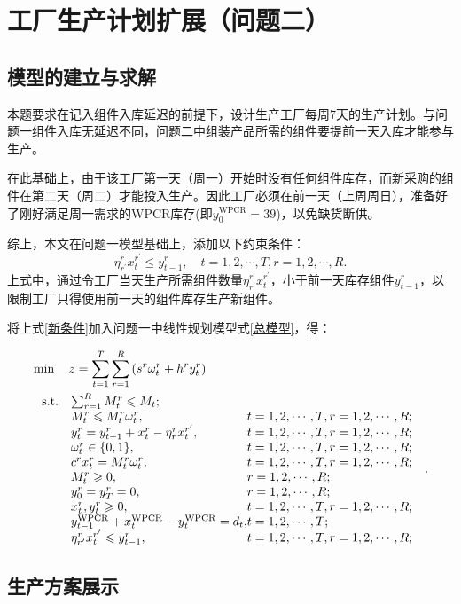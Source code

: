 \section{工厂生产计划扩展（问题二）} %
\label{sec:工厂生产计划扩展}

\subsection{模型的建立与求解} %
\label{sub:模型的建立与求解}

本题要求在记入组件入库延迟的前提下，设计生产工厂每周7天的生产计划。与问题一组件入库无延迟不同，问题二中组装产品所需的组件要提前一天入库才能参与生产。

在此基础上，由于该工厂第一天（周一）开始时没有任何组件库存，而新采购的组件在第二天（周二）才能投入生产。因此工厂必须在前一天（上周周日），准备好了刚好满足周一需求的WPCR库存(即$y_0^{\text{WPCR}} = 39$)，以免缺货断供。

综上，本文在问题一模型基础上，添加以下约束条件：
\begin{equation}\label{新条件}
	\eta_{r^{\prime}}^{r} x_{t}^{r^{\prime}} \leqslant y_{t-1}^{r},\quad t=1,2, \cdots, T, r=1,2, \cdots, R.
\end{equation}
上式中，通过令工厂当天生产所需组件数量$\eta_{r^{\prime}}^{r} x_{t}^{r^{\prime}}$，小于前一天库存组件$y_{t-1}^{r}$，以限制工厂只得使用前一天的组件库存生产新组件。

将上式\ref{新条件}加入问题一中线性规划模型式\ref{总模型}，得：

\begin{equation}\label{二模型}
	\begin{aligned}
&\min \quad z  = \sum_{t  = 1}^{T} \sum_{r = 1}^{R}\left(s^{r} \omega_{t}^{r}+h^{r} y_{t}^{r}\right)\\
& \ \begin{array}{r@{\quad}l@{}l@{\quad}l}
\mathrm{s.t. } 	&\sum_{r=1}^{R} M_{t}^{r} \leqslant M_{t}; &\\
&M_{t}^{r} \leqslant M_{t}^{r} \omega_{t}^{r}, &t=1,2, \cdots, T, r=1,2, \cdots, R;\\
& y_{t}^{r}=y_{t-1}^{r}+x_{t}^{r}-\eta_{r}^{r} x_{t}^{r^{\prime}}, &t=1,2, \cdots, T,  r=1,2, \cdots, R; \\
&\omega_{t}^{r} \in\{0,1\}, &t=1,2, \cdots, T, r=1,2, \cdots, R; \\
&c^{r} x_{t}^{r}=M_{t}^{r} \omega_{t}^{r}, &t=1,2, \cdots, T, r=1,2, \cdots, R; \\
&M_{t}^{r} \geqslant 0,& r=1,2, \cdots, R ;\\
&y_{0}^{r}=y_{T}^{r}=0,& r=1,2, \cdots, R ;\\
&x_{t}^{r}, y_{t}^{r} \geqslant 0, &t=1,2, \cdots, T, r=1,2, \cdots, R;\\
&y_{t-1}^{\mathrm{WPCR}}+x_{t}^{\mathrm{WPCR}}-y_{t}^{\mathrm{WPCR}}=d_{t}, & t=1,2, \cdots, T; \\
&\eta_{r^{\prime}}^{r} x_{t}^{r^{\prime}} \leqslant y_{t-1}^{r}, &t=1,2, \cdots, T, r=1,2, \cdots, R;
\end{array}.
\end{aligned}
\end{equation}

\subsection{生产方案展示} %
\label{sub:生产方案展示}


